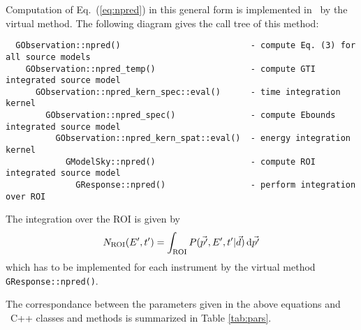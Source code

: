 \documentclass{article}[12pt,a4]
\begin{document}
Computation of Eq.~(\ref{eq:npred}) in this general form is implemented in \this\ by the 
virtual method.
The following diagram gives the call tree of this method:
\begin{verbatim}
  GObservation::npred()                          - compute Eq. (3) for all source models
    GObservation::npred_temp()                   - compute GTI integrated source model
      GObservation::npred_kern_spec::eval()      - time integration kernel
        GObservation::npred_spec()               - compute Ebounds integrated source model
          GObservation::npred_kern_spat::eval()  - energy integration kernel
            GModelSky::npred()                   - compute ROI integrated source model
              GResponse::npred()                 - perform integration over ROI
\end{verbatim}
The integration over the ROI is given by
\begin{equation}
N_{\rm ROI}(E', t') = \int_{\rm ROI} P(\vec{p'}, E', t' | \vec{d}) \, {\rm d}\vec{p'}
\label{eq:nroi}
\end{equation}
which has to be implemented for each instrument by the virtual method
{\tt GResponse::npred()}.

The correspondance between the parameters given in the above equations and
\this\ C++ classes and methods is summarized in Table \ref{tab:pars}.
\end{document}
